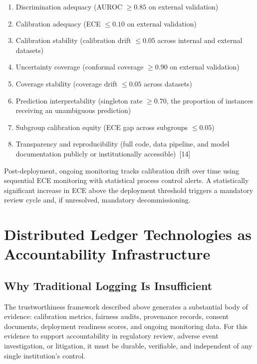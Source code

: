 \documentclass[11pt]{article}
\providecommand{\tightlist}{%
  \setlength{\itemsep}{0pt}\setlength{\parskip}{0pt}}
\begin{document}
\begin{enumerate}
\def\labelenumi{\arabic{enumi}.}
\tightlist
\item
  Discrimination adequacy (AUROC $\geq 0.85$ on external validation)
\item
  Calibration adequacy (ECE $\leq 0.10$ on external validation)
\item
  Calibration stability (calibration drift $\leq 0.05$ across internal
  and external datasets)
\item
  Uncertainty coverage (conformal coverage $\geq 0.90$ on external
  validation)
\item
  Coverage stability (coverage drift $\leq 0.05$ across datasets)
\item
  Prediction interpretability (singleton rate $\geq 0.70$, the
  proportion of instances receiving an unambiguous prediction)
\item
  Subgroup calibration equity (ECE gap across subgroups $\leq 0.05$)
\item
  Transparency and reproducibility (full code, data pipeline, and model
  documentation publicly or institutionally accessible)~{[}14{]}
\end{enumerate}

Post-deployment, ongoing monitoring tracks calibration drift over time
using sequential ECE monitoring with statistical process control alerts.
A statistically significant increase in ECE above the deployment
threshold triggers a mandatory review cycle and, if unresolved,
mandatory decommissioning.


\section{Distributed Ledger Technologies as Accountability
Infrastructure}\label{distributed-ledger-technologies-as-accountability-infrastructure}

\subsection{Why Traditional Logging Is
Insufficient}\label{why-traditional-logging-is-insufficient}

The trustworthiness framework described above generates a substantial
body of evidence: calibration metrics, fairness audits, provenance
records, consent documents, deployment readiness scores, and ongoing
monitoring data. For this evidence to support accountability in
regulatory review, adverse event investigation, or litigation, it must
be durable, verifiable, and independent of any single institution's
control.
\end{document}
